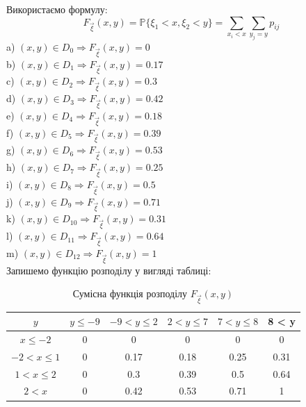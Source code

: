 \documentclass[14pt, a4paper, ukrainian]{extreport}
\begin{document}
	Використаємо формулу:
	$$ F_{\vec \xi }(x, y) = \mathbb{P} \{\xi_1 < x, \xi_2 < y\} = \sum_{x_i < x} \sum_{y_j = y} p_{ij}$$
	a) $(x, y) \in D_0 \Rightarrow F_{\vec \xi}(x, y) = 0$\\
	b) $(x, y) \in D_1 \Rightarrow F_{\vec \xi}(x, y) = 0.17$\\
	c) $(x, y) \in D_2 \Rightarrow F_{\vec \xi}(x, y) = 0.3$\\
	d) $(x, y) \in D_3 \Rightarrow F_{\vec \xi}(x, y) = 0.42$\\
	e) $(x, y) \in D_4 \Rightarrow F_{\vec \xi}(x, y) = 0.18$\\
	f) $(x, y) \in D_5 \Rightarrow F_{\vec \xi}(x, y) = 0.39$\\
	g) $(x, y) \in D_6 \Rightarrow F_{\vec \xi}(x, y) = 0.53$\\
	h) $(x, y) \in D_7 \Rightarrow F_{\vec \xi}(x, y) = 0.25$\\
	i) $(x, y) \in D_8 \Rightarrow F_{\vec \xi}(x, y) = 0.5$\\
	j) $(x, y) \in D_9 \Rightarrow F_{\vec \xi}(x, y) = 0.71$\\
	k) $(x, y) \in D_10 \Rightarrow F_{\vec \xi}(x, y) = 0.31$\\
	l) $(x, y) \in D_11 \Rightarrow F_{\vec \xi}(x, y) = 0.64$\\
	m) $(x, y) \in D_12 \Rightarrow F_{\vec \xi}(x, y) = 1$\\
	
	Запишемо функцію розподілу у вигляді таблиці:
	
	\begin{table}[H]
		\caption{\label{tab:Fxy}Сумісна функція розподілу $F_{\vec \xi}(x, y)$}
		\begin{center}
			\begin{tabular}{| c | c | c | c | c | c |}
				\hline
				\backslashbox{$x$} {$y$} & $y \le -9$ & $ -9 < y \le 2$ & $ 2 < y \le 7 $& $ 7 < y \le 8 $ & 8 < y\\
				\hline
				$ x \le -2 $ & 0 & 0 & 0 & 0 & 0\\
				\hline
				$ -2 < x \le 1 $ & 0 & 0.17 & 0.18 & 0.25 & 0.31 \\
				\hline
				$ 1 < x \le 2 $ & 0 & 0.3 & 0.39 &  0.5 & 0.64\\
				\hline
				$ 2 < x $ & 0 & 0.42 & 0.53 & 0.71 & 1\\
				\hline
				
			\end{tabular}
		\end{center}
	\end{table}
\end{document}
